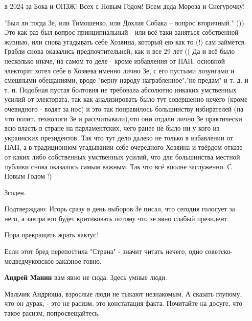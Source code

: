 \begin{itemize}
в 2024 за Бока и ОПЗЖ! Всех с Новым Годом! Всем деда Мороза и Снегурочку!


"Был ли тогда Зе, или Тимошенко, или Дохлая Собака – вопрос вторичный." ))) Это
как раз был вопрос принципиальный - или всё-таки заняться собственной
жизнью, или снова угадывать себе Хозяина, который ею как то (!) сам займётся.
Грабли снова оказались предпочтительней, как и все 29 лет (( Да и всё было
несколько иначе, на самом то деле - кроме избавления от ПАП, основной электорат
хотел себе в Хозяева именно лично Зе, с его пустыми лозунгами и смешными
обещаниями, вроде "верну народу награбленное","не предам" и т. д. и т. п. Подобная
пустая болтовня не требовала абсолютно никаких умственных усилий от
электората, так как анализировать было тут совершенно нечего (кроме очевидного -
водят за нос) и это так понравилось большинству избирателей (на что
полит. технологи Зе и рассчитывали),что они отдали лично Зе практически всю
власть в стране на парламентских, чего ранее не было ни у кого из украинских
президентов. Так что тут дело далеко не только в избавлении от ПАП, а в
традиционном угадывании себе очередного Хозяина и твёрдом отказе от каких либо
собственных умственных усилий, что для большинства местной публики снова
оказалось самым важным. Так что всё вполне заслуженно. С Новым Годом !)

\begin{itemize} %
Згоден.
\end{itemize} %


Подтверждаю: Игорь сразу в день выборов Зе писал, что сегодня голосует за него,
а завтра его будет критиковать потому что зе явно слабый президент.

Пора прекращать жрать кактус!

Если этот бред перепостила "Страна" - значит читать нечего, одно советско-медведчуковское заказное говно.

\begin{itemize} %
\textbf{Андрей Манин} вам явно не сюда. Здесь умные люди.


Мальчик Андрюша, взрослые люди не тыкают незнакомым. А сказать глупому, что он
дурак, - это не расизм, это констатация факта. Почитайте на досуге, что такое
расизм, попросвещайтесь.


\end{itemize}
\end{itemize}
